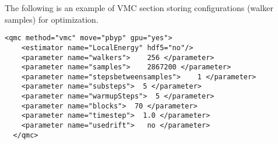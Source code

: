 The following is an example of VMC section storing configurations (walker samples) for optimization.
\begin{lstlisting}[style=QMCPXML]
  <qmc method="vmc" move="pbyp" gpu="yes">
    <estimator name="LocalEnergy" hdf5="no"/>
    <parameter name="walkers">    256 </parameter>
    <parameter name="samples">    2867200 </parameter>
    <parameter name="stepsbetweensamples">    1 </parameter>
    <parameter name="substeps">  5 </parameter>
    <parameter name="warmupSteps">  5 </parameter>
    <parameter name="blocks">  70 </parameter>
    <parameter name="timestep">  1.0 </parameter>
    <parameter name="usedrift">   no </parameter>
  </qmc>
\end{lstlisting}



